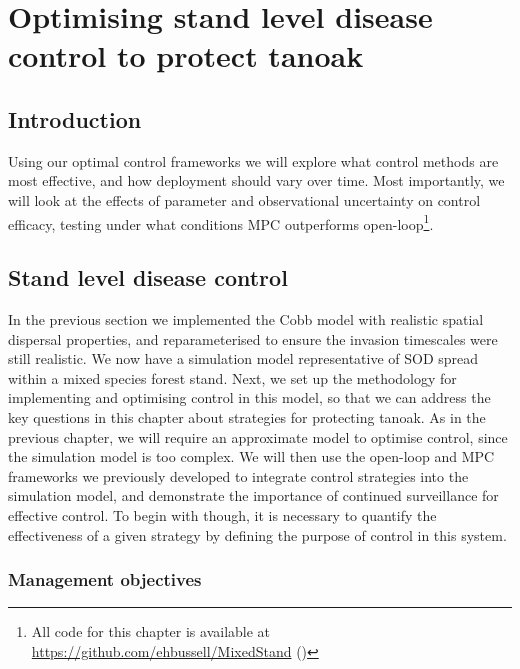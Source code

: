 %
\chapter{Optimising stand level disease control to protect tanoak\label{ch:protect_tanoak_control}}

\section{Introduction\label{sec:ch6:intro}}


Using our optimal control frameworks we will explore what control methods are most effective, and how deployment should vary over time. Most importantly, we will look at the effects of parameter and observational uncertainty on control efficacy, testing under what conditions MPC outperforms open-loop\footnote{All code for this chapter is available at \url{https://github.com/ehbussell/MixedStand} ()}.

\section{Stand level disease control\label{sec:ch6:control}}

In the previous section we implemented the Cobb model with realistic spatial dispersal properties, and reparameterised to ensure the invasion timescales were still realistic. We now have a simulation model representative of SOD spread within a mixed species forest stand. Next, we set up the methodology for implementing and optimising control in this model, so that we can address the key questions in this chapter about strategies for protecting tanoak. As in the previous chapter, we will require an approximate model to optimise control, since the simulation model is too complex. We will then use the open-loop and MPC frameworks we previously developed to integrate control strategies into the simulation model, and demonstrate the importance of continued surveillance for effective control. To begin with though, it is necessary to quantify the effectiveness of a given strategy by defining the purpose of control in this system.

\subsection{Management objectives}\label{sec:ch6:mgmt_objs}

